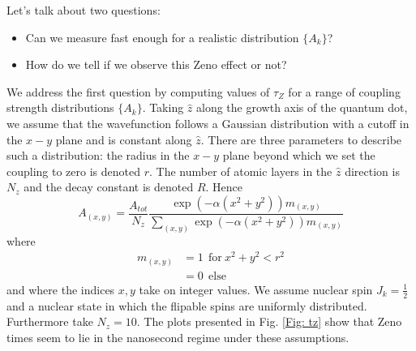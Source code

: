 \documentclass[aps, pra, amsfonts, a4paper, showpacs]{revtex4-1}
\begin{document}
Let's talk about two questions:
\begin{itemize}
\item Can we measure fast enough for a realistic distribution $\{A_k\}$?
\item How do we tell if we observe this Zeno effect or not?
\end{itemize}

We address the first question by computing values of $\tau_Z$ for a range of coupling strength distributions $\{ A_k \}$. Taking $\hat{z}$ along the growth axis of the quantum dot, we assume that the wavefunction follows a Gaussian distribution with a cutoff in the $x-y$ plane and is constant along $\hat{z}$. There are three parameters to describe such a distribution: the radius in the $x-y$ plane beyond which we set the coupling to zero is denoted $r$. The number of atomic layers in the $\hat{z}$ direction is $N_z$ and the decay constant is denoted $R$. Hence
\begin{equation}
A_{(x,y)}=\frac{A_{tot}}{N_z}\frac{\exp(-\alpha(x^2+y^2))m_{(x,y)}}{\sum_{(x,y)}\exp(-\alpha(x^2+y^2))m_{(x,y)}}
\label{Eq: dist}
\end{equation}
where
\[\begin{split}
m_{(x,y)}&= 1\ \  \mathrm{for}\ x^2+y^2<r^2 \\
 &= 0\ \  \mathrm{else}
\end{split}\] and where the indices $x,y$ take on integer values.
We assume nuclear spin $J_k=\frac{1}{2}$ and a nuclear state in which the flipable spins are uniformly distributed. Furthermore take $N_z=10$.
The plots presented in Fig. \ref{Fig: tz} show that Zeno times seem to lie in the nanosecond regime under these assumptions.
\end{document}
